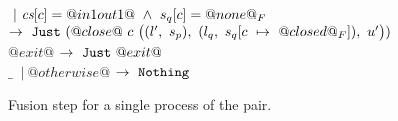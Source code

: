 \begin{figure*}
\begin{tabbing}
\> \> $~|~\cs[c]=@in1out1@ ~\wedge~ s_q[c]=@none@_F$ 
\> $\to~\Just (@close@~c~
      \nextStep
        {l'}{s_p}
        {l_q}{\HeapUpdateOne{c}{@closed@_F}{s_q}}
        {u'})
    $ 
\> 
\\[1ex]

\> $@exit@$
\> 
\> $\to~\Just @exit@$
\> 
\\[1ex]


\> $\_$ \> $~|~ @otherwise@ $
\> $\to ~ \Nothing$
\> 


\end{tabbing}

\caption{Fusion step for a single process of the pair.} 

\label{fig:Finite:tryStep}
\end{figure*}

